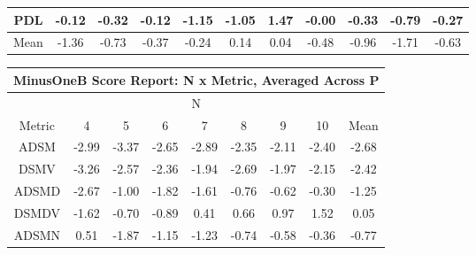 \begin{longtable}{ | c || c | c | c | c | c | c | c | c | c || c |}
PDL &  \cellcolor[HTML]{FFFFFF} -0.12 &  \cellcolor[HTML]{FFF7F7} -0.32 &  \cellcolor[HTML]{FFFFFF} -0.12 &  \cellcolor[HTML]{FFDFDF} -1.15 &  \cellcolor[HTML]{FFE7E7} -1.05 &  \cellcolor[HTML]{D7D7FF} 1.47 &  \cellcolor[HTML]{FFFFFF} -0.00 &  \cellcolor[HTML]{FFF7F7} -0.33 &  \cellcolor[HTML]{FFEFEF} -0.79 &  \cellcolor[HTML]{FFF7F7} -0.27 \\
\hline
\hline
Mean  &  \cellcolor[HTML]{FFDFDF} -1.36 &  \cellcolor[HTML]{FFEFEF} -0.73 &  \cellcolor[HTML]{FFF7F7} -0.37 &  \cellcolor[HTML]{FFF7F7} -0.24 &  \cellcolor[HTML]{FFFFFF} 0.14 &  \cellcolor[HTML]{FFFFFF} 0.04 &  \cellcolor[HTML]{FFEFEF} -0.48 &  \cellcolor[HTML]{FFE7E7} -0.96 &  \cellcolor[HTML]{FFD7D7} -1.71 &  \cellcolor[HTML]{FFEFEF} -0.63 \\
\hline
\end{longtable}
\begin{longtable}{ | c || c | c | c | c | c | c | c || c |}
\hline
\multicolumn{9}{|c|}{ MinusOneB Score Report: N x Metric, Averaged Across P } \\
\hline
\multicolumn{9}{|c|}{ N } \\
\hline
Metric & 4 & 5 & 6 & 7 & 8 & 9 & 10 & Mean\\
\hline
\hline
\endhead
ADSM &  \cellcolor[HTML]{FFB7B7} -2.99 &  \cellcolor[HTML]{FFA7A7} -3.37 &  \cellcolor[HTML]{FFBFBF} -2.65 &  \cellcolor[HTML]{FFB7B7} -2.89 &  \cellcolor[HTML]{FFC7C7} -2.35 &  \cellcolor[HTML]{FFC7C7} -2.11 &  \cellcolor[HTML]{FFBFBF} -2.40 &  \cellcolor[HTML]{FFBFBF} -2.68 \\
DSMV &  \cellcolor[HTML]{FFAFAF} -3.26 &  \cellcolor[HTML]{FFBFBF} -2.57 &  \cellcolor[HTML]{FFC7C7} -2.36 &  \cellcolor[HTML]{FFCFCF} -1.94 &  \cellcolor[HTML]{FFBFBF} -2.69 &  \cellcolor[HTML]{FFCFCF} -1.97 &  \cellcolor[HTML]{FFC7C7} -2.15 &  \cellcolor[HTML]{FFBFBF} -2.42 \\
ADSMD &  \cellcolor[HTML]{FFBFBF} -2.67 &  \cellcolor[HTML]{FFE7E7} -1.00 &  \cellcolor[HTML]{FFCFCF} -1.82 &  \cellcolor[HTML]{FFD7D7} -1.61 &  \cellcolor[HTML]{FFEFEF} -0.76 &  \cellcolor[HTML]{FFEFEF} -0.62 &  \cellcolor[HTML]{FFF7F7} -0.30 &  \cellcolor[HTML]{FFDFDF} -1.25 \\
DSMDV &  \cellcolor[HTML]{FFD7D7} -1.62 &  \cellcolor[HTML]{FFEFEF} -0.70 &  \cellcolor[HTML]{FFE7E7} -0.89 &  \cellcolor[HTML]{F7F7FF} 0.41 &  \cellcolor[HTML]{EFEFFF} 0.66 &  \cellcolor[HTML]{E7E7FF} 0.97 &  \cellcolor[HTML]{D7D7FF} 1.52 &  \cellcolor[HTML]{FFFFFF} 0.05 \\
ADSMN &  \cellcolor[HTML]{EFEFFF} 0.51 &  \cellcolor[HTML]{FFCFCF} -1.87 &  \cellcolor[HTML]{FFDFDF} -1.15 &  \cellcolor[HTML]{FFDFDF} -1.23 &  \cellcolor[HTML]{FFEFEF} -0.74 &  \cellcolor[HTML]{FFEFEF} -0.58 &  \cellcolor[HTML]{FFF7F7} -0.36 &  \cellcolor[HTML]{FFEFEF} -0.77 \\

\end{longtable}
